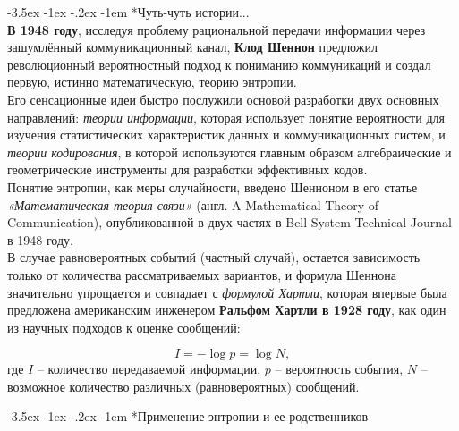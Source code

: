 \documentclass[a4paper, 12pt]{scrreprt}
\makeatletter
\newcommand{\ot}[1]{\textcolor[rgb]{.55,.45,.55}{#1}}
\renewcommand\section{\@startsection{section}{1}{\z@}%
        {-3.5ex \@plus -1ex \@minus -.2ex}%
        {-1em}%
        {\normalfont\large\slshape\bfseries\ot}}
\makeatother
\begin{document}
\section*{Чуть-чуть истории... }~\
\\

\textbf{В 1948 году}, исследуя проблему рациональной передачи информации через зашумлённый коммуникационный канал, \textbf{Клод Шеннон} предложил революционный вероятностный подход к пониманию коммуникаций и создал первую, истинно математическую, теорию энтропии. 
\\


Его сенсационные идеи быстро послужили основой разработки двух основных направлений: \textit{теории информации}, которая использует понятие вероятности для изучения статистических характеристик данных и коммуникационных систем, и \textit{теории кодирования}, в которой используются главным образом алгебраические и геометрические инструменты для разработки эффективных кодов.
\\


Понятие энтропии, как меры случайности, введено Шенноном в его статье \textit{«Математическая теория связи»} (англ. A Mathematical Theory of Communication), опубликованной в двух частях в Bell System Technical Journal в 1948 году.
\\


В случае равновероятных событий (частный случай), остается зависимость только от количества рассматриваемых вариантов, и формула Шеннона значительно упрощается и совпадает с \textit{формулой Хартли}, которая впервые была предложена американским инженером \textbf{Ральфом Хартли в 1928 году}, как один из научных подходов к оценке сообщений:

\[I=-\log p = \log N ,\]
где $I$ – количество передаваемой информации, $p$ – вероятность события, $N$ – возможное количество различных (равновероятных) сообщений.

\section*{Применение энтропии и ее родственников}~\
\\


\end{document}
